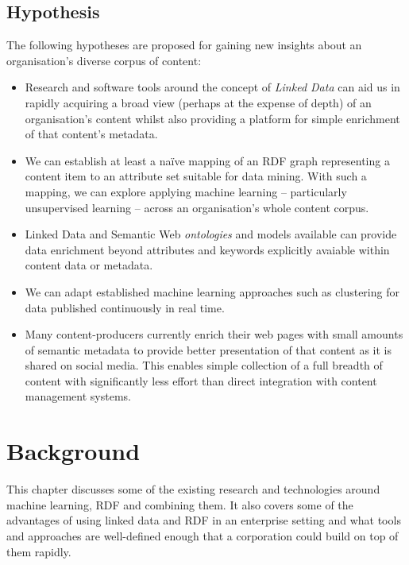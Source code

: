 \documentclass[10pt,a4paper]{report}
\begin{document}
\section{Hypothesis}

The following hypotheses are proposed for gaining new insights about an
organisation's diverse corpus of content:

\begin{itemize}

\item Research and software tools around the concept of \emph{Linked Data} can
aid us in rapidly acquiring a broad view (perhaps at the expense of depth) of an
organisation's content whilst also providing a platform for simple enrichment of
that content's metadata.

\item We can establish at least a na\"ive mapping of an RDF graph representing a
content item to an attribute set suitable for data mining. With such a mapping,
we can explore applying machine learning -- particularly unsupervised learning
-- across an organisation's whole content corpus.

\item Linked Data and Semantic Web \emph{ontologies} and models available can
provide data enrichment beyond attributes and keywords explicitly avaiable
within content data or metadata.

\item We can adapt established machine learning approaches such as clustering
for data published continuously in real time.

\item Many content-producers currently enrich their web pages with small
amounts of semantic metadata to provide better presentation of that content
as it is shared on social media. This enables simple collection of a full
breadth of content with significantly less effort than direct integration
with content management systems.

\end{itemize}

\chapter{Background}

This chapter discusses some of the existing research and technologies around
machine learning, RDF and combining them. It also covers some of the advantages
of using linked data and RDF in an enterprise setting and what tools and
approaches are well-defined enough that a corporation could build on top of
them rapidly.
\end{document}
